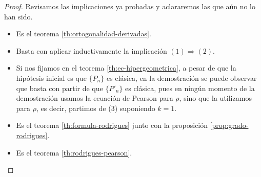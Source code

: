 \begin{proof}
    
    Revisamos las implicaciones ya probadas y aclararemos las que aún no lo han sido.
    \begin{itemize}
        \item[\fbox{$1.\Rightarrow 2.$}] Es el teorema \ref{th:ortogonalidad-derivadas}.

        \item[\fbox{$2.\Rightarrow 3.$}] Basta con aplicar inductivamente la implicación $(1)\Rightarrow (2)$.
        \item[\fbox{$3.\Rightarrow 4.$}] Si nos fijamos en el teorema \ref{th:ec-hipergeometrica}, a pesar de que la hipótesis inicial es que $\{P_n\}$ es clásica, en la demostración se puede observar que basta con partir de que $\{P'_n\}$ es clásica, pues en ningún momento de la demostración usamos la ecuación de Pearson para $\rho$, sino que la utilizamos para $\rho$, es decir, partimos de (3) suponiendo $k=1$.
        \item[\fbox{$4.\Rightarrow 5.$}] Es el teorema \ref{th:formula-rodrigues} junto con la proposición \ref{prop:grado-rodrigues}.
        \item[\fbox{$5.\Rightarrow 1.$}] Es el teorema \ref{th:rodrigues-pearson}.
         
    \end{itemize}
\end{proof}

